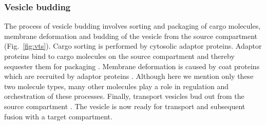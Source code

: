 \subsubsection{Vesicle budding} 
The process of vesicle budding involves sorting and packaging of cargo molecules, membrane deformation and budding of the vesicle from the source compartment (Fig.~\ref{fig:vts}). 
%
Cargo sorting is performed by cytosolic adaptor proteins. 
%
Adaptor proteins bind to cargo molecules on the source
compartment and thereby sequester them for packaging \cite{paczkowski2015cargo}. 
%
Membrane deformation is caused by coat proteins which are recruited by adaptor proteins \cite{faini2013vesicle}. 
%
Although here we mention only these two molecule types, many other molecules play a role in regulation and orchestration of these processes.
%
%
Finally, transport vesicles bud out from the source
compartment \cite{cocucci2014dynamin}. 
%
The vesicle is now ready for transport and subsequent fusion with a target compartment.
%
%

